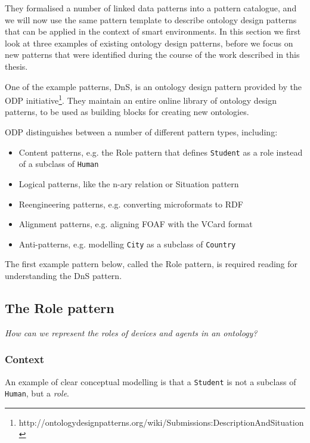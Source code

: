 They formalised a number of linked data patterns into a pattern catalogue, and we will now use the same pattern template to describe ontology design patterns that can be applied in the context of smart environments. In this section we first look at three examples of existing ontology design patterns, before we focus on new patterns that were identified during the course of the work described in this thesis.

One of the example patterns, \ac{DnS}, is an ontology design pattern provided by the \ac{ODP} initiative\footnote{http://ontologydesignpatterns.org/wiki/Submissions:DescriptionAndSituation}. They maintain an entire online library of ontology design patterns, to be used as building blocks for creating new ontologies. 

\ac{ODP} distinguishes between a number of different pattern types, including:

\begin{itemize}
	\item Content patterns, e.g. the Role pattern that defines \texttt{Student} as a role instead of a subclass of \texttt{Human}
	\item Logical patterns, like the n-ary relation or Situation pattern
	\item Reengineering patterns, e.g. converting microformats to \ac{RDF}
	\item Alignment patterns, e.g. aligning \ac{FOAF} with the VCard format
	\item Anti-patterns, e.g. modelling \texttt{City} as a subclass of \texttt{Country}
\end{itemize}

The first example pattern below, called the Role pattern, is required reading for understanding the \ac{DnS} pattern.


\subsection{The Role pattern}\label{Roles}

\emph{How can we represent the roles of devices and agents in an ontology?}

\subsubsection{Context}
An example of clear conceptual modelling\label{ClearConceptualModelling} is that a \texttt{Student} is not a subclass of \texttt{Human}, but a \emph{role}.

